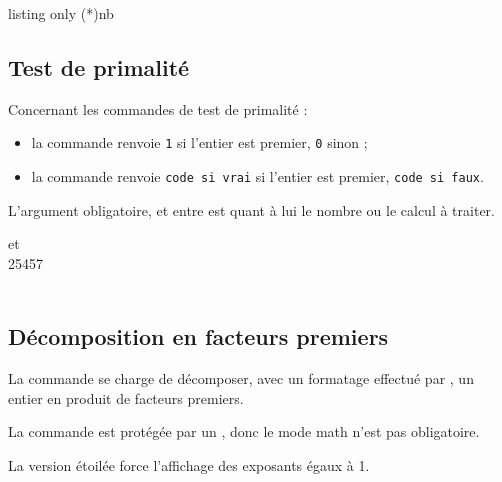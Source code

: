 \begin{PresCodeTexPL}{listing only}
\pfldecompnb(*){nb}
\end{PresCodeTexPL}

\subsection{Test de primalité}

\begin{cautionblock}
Concernant les commandes de test de primalité :

\begin{itemize}
	\item la commande  renvoie \texttt{1} si l'entier est premier, \texttt{0} sinon ;
	\item la commande  renvoie \texttt{code si vrai} si l'entier est premier, \texttt{code si faux}.
\end{itemize}

L'argument obligatoire, et entre  est quant à lui le nombre ou le calcul à traiter.
\end{cautionblock}

\begin{PresCodePL}{}
 et  \\
\num{25457} \\
\\
\end{PresCodePL}

\subsection{Décomposition en facteurs premiers}

\begin{cautionblock}
La commande se charge de décomposer, avec un formatage effectué par , un entier en produit de facteurs premiers.

La commande est protégée par un , donc le mode \textsf{math} n'est pas obligatoire.

La version étoilée force l'affichage des exposants égaux à 1.
\end{cautionblock}

